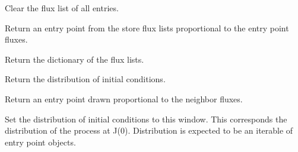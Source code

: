 \documentclass[letterpaper,10pt,english]{sphinxmanual}
\begin{document}
\begin{fulllineitems}

\begin{fulllineitems}
\label{applications/applications.doc:window.window.clear_flux_list}
Clear the flux list of all entries.

\end{fulllineitems}


\begin{fulllineitems}
\label{applications/applications.doc:window.window.get_entry_point}
Return an entry point from the store flux lists proportional to the entry point fluxes.

\end{fulllineitems}


\begin{fulllineitems}
\label{applications/applications.doc:window.window.get_flux_lists}
Return the dictionary of the flux lists.

\end{fulllineitems}


\begin{fulllineitems}
\label{applications/applications.doc:window.window.get_initial_conditions}
Return the distribution of initial conditions.

\end{fulllineitems}


\begin{fulllineitems}
\label{applications/applications.doc:window.window.reinject}
Return an entry point drawn proportional to the neighbor fluxes.

\end{fulllineitems}


\begin{fulllineitems}
\label{applications/applications.doc:window.window.set_initial_conditions}
Set the distribution of initial conditions to this window. This corresponds the distribution of the process at J(0). Distribution is expected to be an iterable of entry point objects.


\end{fulllineitems}
\end{fulllineitems}
\end{document}
